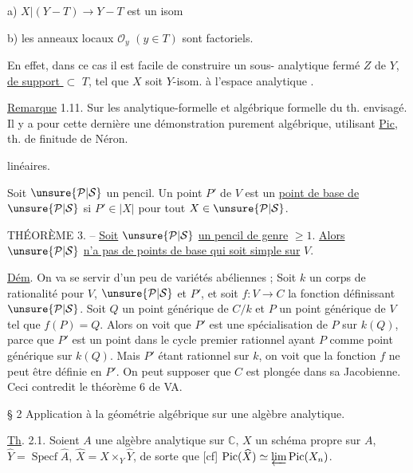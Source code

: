 a) $X|(Y-T)\longrightarrow Y-T$ est  un isom

b) les anneaux locaux $\mathcal O_y$ $(y\in T)$ sont factoriels.

En effet, dans ce cas il est facile de construire un sous- analytique fermé $Z$ de $Y$, \uline{de support $\subset$} $T$, tel que $X$ soit $Y$-isom. à l'espace analytique .

\uline{Remarque} 1.11. Sur les  analytique-formelle et algébrique formelle du th. envisagé. Il y a pour cette dernière une démonstration purement algébrique, utilisant \uline{Pic},  th. de finitude de Néron.


linéaires.

Soit $\unsure{\mathcal P|\mathcal S}$ un pencil. Un point $P'$ de $V$ est un \uline{point de base de} $\unsure{\mathcal P|\mathcal S}$ si $P'\in|X|$ pour tout $X\in\unsure{\mathcal P|\mathcal S}$.

THÉORÈME 3. -- \uline{Soit} $\unsure{\mathcal P|\mathcal S}$ \uline{un pencil de genre} $\geq1$. \uline{Alors} $\unsure{\mathcal P|\mathcal S}$ \uline{n'a pas de points de base qui soit simple sur} $V$.

\uline{Dém}. On va se servir d'un peu de variétés abéliennes ; Soit $k$ un corps de rationalité pour $V$, $\unsure{\mathcal P|\mathcal S}$ et $P'$, et soit $f:V\longrightarrow C$ la fonction définissant $\unsure{\mathcal P|\mathcal S}$. Soit $Q$ un point générique de $C/k$ et $P$ un point générique de $V$ tel que $f(P)=Q$. Alors on voit que $P'$ est une spécialisation de $P$ sur $k(Q)$, parce que $P'$ est un point dans le cycle premier rationnel ayant $P$ comme point générique sur $k(Q)$. Mais $P'$ étant rationnel sur $k$, on voit que la fonction $f$ ne peut être définie en $P'$. On peut supposer que $C$ est plongée dans sa Jacobienne. Ceci contredit le théorème 6 de VA.


§ 2 Application à la géométrie algébrique sur une algèbre analytique.

\uline{Th}. 2.1. Soient $A$ une algèbre analytique sur $\mathbb C$,  $X$ un schéma propre sur $A$,  $\widehat Y=\operatorname{Specf}\widehat A$, $\widehat X=X\times_Y\widehat Y$,  de sorte que [cf] \deleted{$\unsure{\varphi}$} $\operatorname{Pic}(\widehat X)\simeq\varprojlim\operatorname{Pic}(X_n)$.

